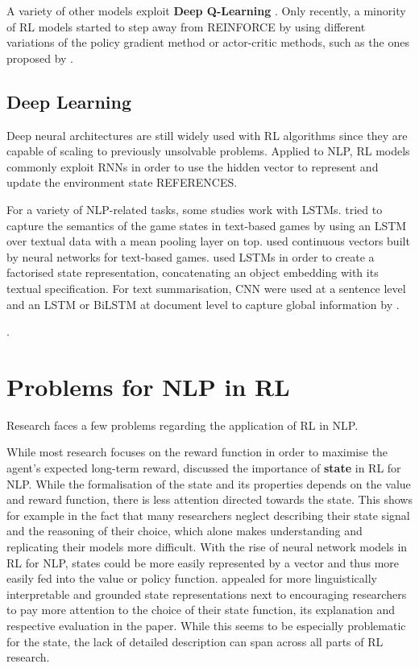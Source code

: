 \documentclass[11pt,a4paper]{article}
\begin{document}
A variety of other models exploit \textbf{Deep Q-Learning} \citep{narasimhan-etal-2016-improving, mosallanezhad-etal-2019-deep, ling-etal-2017-learning}. Only recently, a minority of RL models started to step away from REINFORCE by using different variations of the policy gradient method \citep{branavan-2009, li-etal-2018-paraphrase, li-etal-2016-deep, le-fokkens-2017-tackling} or actor-critic methods, such as the ones proposed by \citet{dethlefs-cuayahuitl-2011,grissom-ii-etal-2014-dont, he-etal-2016-deep-reinforcement, chen-bansal-2018-fast, goyal-2019}. 

\subsection{Deep Learning}
Deep neural architectures are still widely used with RL algorithms since they are capable of scaling to previously unsolvable problems. Applied to NLP, RL models commonly exploit RNNs in order to use the hidden vector to represent and update the environment state REFERENCES. 

For a variety of NLP-related tasks, some studies work with LSTMs. \citet{narasimhan-etal-2016-improving} tried to capture the semantics of the game states in text-based games by using an LSTM over textual data with a mean pooling layer on top. \citet{he-etal-2016-deep-reinforcement} used continuous vectors built by neural networks for text-based games. \citet{narasimhan-2018} used LSTMs in order to create a factorised state representation, concatenating an object embedding with its textual specification. For text summarisation, CNN were used at a sentence level and an LSTM or BiLSTM at document level to capture global information by \citet{chen-bansal-2018-fast}. 

\citet{yasui-etal-2019, zhang-2018, li-etal-2016-deep, ranzato2015sequence}. 

\section{Problems for NLP in RL}
Research faces a few problems regarding the application of RL in NLP. 

While most research focuses on the reward function in order to maximise the agent's expected long-term reward, \citet{madureira2020} discussed the importance of \textbf{state} in RL for NLP. While the formalisation of the state and its properties depends on the value and reward function, there is less attention directed towards the state. This shows for example in the fact that many researchers neglect describing their state signal and the reasoning of their choice, which alone makes understanding and replicating their models more difficult. With the rise of neural network models in RL for NLP, states could be more easily represented by a vector and thus more easily fed into the value or policy function. \citet{madureira2020} appealed for more linguistically interpretable and grounded state representations next to encouraging researchers to pay more attention to the choice of their state function, its explanation and respective evaluation in the paper. While this seems to be especially problematic for the state, the lack of detailed description can span across all parts of RL research.
\end{document}
